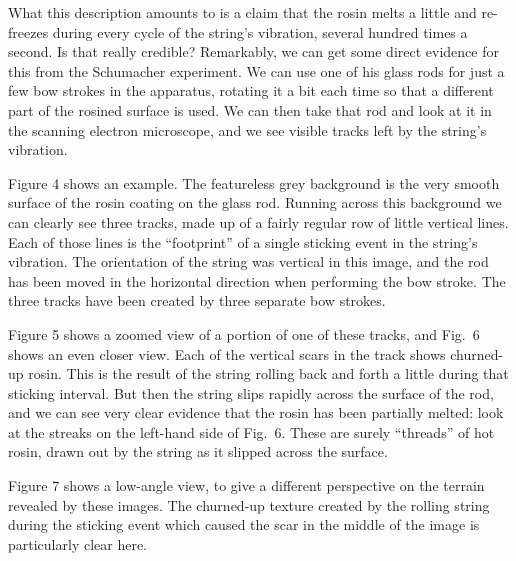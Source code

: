   What this description amounts to is a claim that the rosin melts a little and 
  re-freezes during every cycle of the string’s vibration, several hundred 
  times a second. Is that really credible? Remarkably, we can get some direct 
  evidence for this from the Schumacher experiment. We can use one of his glass 
  rods for just a few bow strokes in the apparatus, rotating it a bit each time 
  so that a different part of the rosined surface is used. We can then take 
  that rod and look at it in the scanning electron microscope, and we see 
  visible tracks left by the string’s vibration. 

  Figure 4 shows an example. The featureless grey background is the very smooth 
  surface of the rosin coating on the glass rod. Running across this background 
  we can clearly see three tracks, made up of a fairly regular row of little 
  vertical lines. Each of those lines is the “footprint” of a single sticking 
  event in the string’s vibration. The orientation of the string was vertical 
  in this image, and the rod has been moved in the horizontal direction when 
  performing the bow stroke. The three tracks have been created by three 
  separate bow strokes. 


  Figure 5 shows a zoomed view of a portion of one of these tracks, and Fig.\ 6 
  shows an even closer view. Each of the vertical scars in the track shows 
  churned-up rosin. This is the result of the string rolling back and forth a 
  little during that sticking interval. But then the string slips rapidly 
  across the surface of the rod, and we can see very clear evidence that the 
  rosin has been partially melted: look at the streaks on the left-hand side of 
  Fig.\ 6. These are surely ``threads'' of hot rosin, drawn out by the string 
  as it slipped across the surface. 



  Figure 7 shows a low-angle view, to give a different perspective on the 
  terrain revealed by these images. The churned-up texture created by the 
  rolling string during the sticking event which caused the scar in the middle 
  of the image is particularly clear here. 

